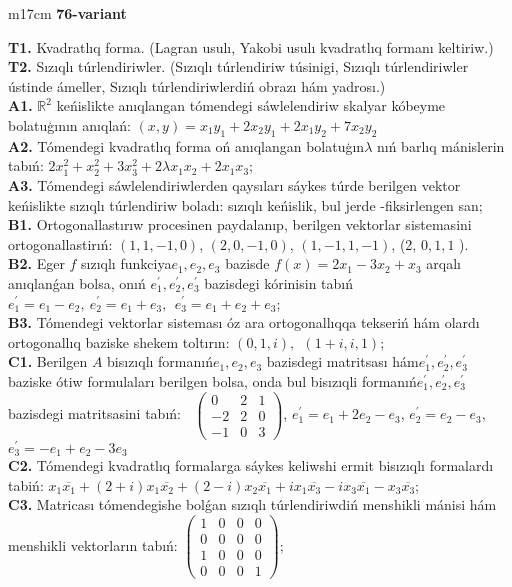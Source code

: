 \documentclass{article}
\begin{document}
\begin{tabular}{m{17cm}}
\textbf{76-variant}
\newline

\textbf{T1.} Kvadratlıq forma. (Lagran usulı, Yakobi usulı kvadratlıq formanı keltiriw.) \\
\textbf{T2.} Sızıqlı túrlendiriwler.  (Sızıqlı túrlendiriw túsinigi, Sızıqlı túrlendiriwler ústinde ámeller, Sızıqlı túrlendiriwlerdiń obrazı hám yadrosı.) \\
\textbf{A1.} \(\mathbb{R}^{2}\) keńislikte anıqlangan tómendegi sáwlelendiriw skalyar kóbeyme bolatuģının anıqlań: \((x,y) = x_{1}y_{1} + 2x_{2}y_{1} + 2x_{1}y_{2} + 7x_{2}y_{2}\) \\
\textbf{A2.} Tómendegi kvadratlıq forma oń anıqlangan bolatuģın\(\lambda\) nıń barlıq mánislerin tabıń: \(2x_{1}^{2} + x_{2}^{2} + 3x_{3}^{2} + 2\lambda x_{1}x_{2} + 2x_{1}x_{3}\); \\
\textbf{A3.} Tómendegi sáwlelendiriwlerden qaysıları sáykes túrde berilgen vektor keńislikte sızıqlı túrlendiriw boladı: sızıqlı keńislik, bul jerde -fiksirlengen san; \\
\textbf{B1.} Ortogonallastırıw procesinen paydalanıp, berilgen vektorlar sistemasini ortogonallastirıń: \((1,1, - 1,0)\), \((2,0, - 1,0)\), \((1, - 1,1, - 1)\), (2, \(0,1,1\) ). \\
\textbf{B2.} Eger \(f\) sızıqlı funkciya\(e_{1},e_{2},e_{3}\) bazisde \(f(x) = 2x_{1} - 3x_{2} + x_{3}\) arqalı anıqlanǵan bolsa, onıń \(e_{1}^{'},e_{2}^{'},e_{3}^{'}\) bazisdegi kórinisin tabıń\(e_{1}^{'} = e_{1} - e_{2},\ e_{2}^{'} = e_{1} + e_{3},\ \ e_{3}^{'} = e_{1} + e_{2} + e_{3}\); \\
\textbf{B3.} Tómendegi vektorlar sisteması óz ara ortogonallıqqa tekseriń hám olardı ortogonallıq baziske shekem toltırın: \((0,1,i),\ \ (1 + i,i,1)\); \\
\textbf{C1.} Berilgen \(A\) bisızıqlı formanıń\(e_{1},e_{2},e_{3}\) bazisdegi matritsası hám\(e_{1}^{'},e_{2}^{'},e_{3}^{'}\) baziske ótiw formulaları berilgen bolsa, onda bul bisızıqli formanıń\(e_{1}^{'},e_{2}^{'},e_{3}^{'}\) bazisdegi matritsasini tabıń: \(\ \) \(\begin{pmatrix} 0 & 2 & 1 \\  - 2 & 2 & 0 \\  - 1 & 0 & 3 \end{pmatrix}\), \(e_{1}^{'} = e_{1} + 2e_{2} - e_{3}\), \(e_{2}^{'} = e_{2} - e_{3}\), \(e_{3}^{'} = - e_{1} + e_{2} - 3e_{3}\) \\
\textbf{C2.} Tómendegi kvadratlıq formalarga sáykes keliwshi ermit bisızıqlı formalardı tabiń: \(x_{1}\overline{x_{1}} + (2 + i)x_{1}\overline{x_{2}} + (2 - i)x_{2}\overline{x_{1}} + ix_{1}\overline{x_{3}} - ix_{3}\overline{x_{1}} - x_{3}\overline{x_{3}}\); \\
\textbf{C3.} Matricası tómendegishe bolǵan sızıqlı túrlendiriwdiń menshikli mánisi hám menshikli vektorların tabıń: \(\begin{pmatrix} 1 & 0 & 0 & 0 \\ 0 & 0 & 0 & 0 \\ 1 & 0 & 0 & 0 \\ 0 & 0 & 0 & 1 \end{pmatrix}\); \\


\end{tabular}
\end{document}
